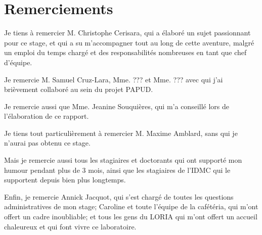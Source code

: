 \maketitle
{}
	
	
\makesecondtitle

\section*{Remerciements}
{
	Je tiens à remercier M. Christophe Cerisara, qui a élaboré un sujet passionnant pour ce stage, et qui a su m'accompagner tout au long de cette aventure, malgré un emploi du temps chargé et des responsabilités nombreuses en tant que chef d'équipe.
	
	Je remercie M. Samuel Cruz-Lara, Mme. ??? et Mme. ??? avec qui j'ai brièvement collaboré au sein du projet PAPUD. %
	
	Je remercie aussi que Mme. Jeanine Souquières, qui m'a conseillé lors de l'élaboration de ce rapport.
	
	Je tiens tout particulièrement à remercier 
	M. Maxime Amblard, sans qui je n'aurai pas obtenu ce stage.
	
	Mais je remercie aussi tous les stagiaires et doctorants qui ont supporté mon humour pendant plus de 3 mois, ainsi que les stagiaires de l'IDMC qui le supportent depuis bien plus longtemps.
	
	Enfin, je remercie Annick Jacquot, qui s'est chargé de toutes les questions administratives de mon stage; Caroline et toute l'équipe de la cafétéria, qui m'ont offert un cadre inoubliable; et tous les gens du LORIA qui m'ont offert un accueil chaleureux et qui font vivre ce laboratoire.
}


